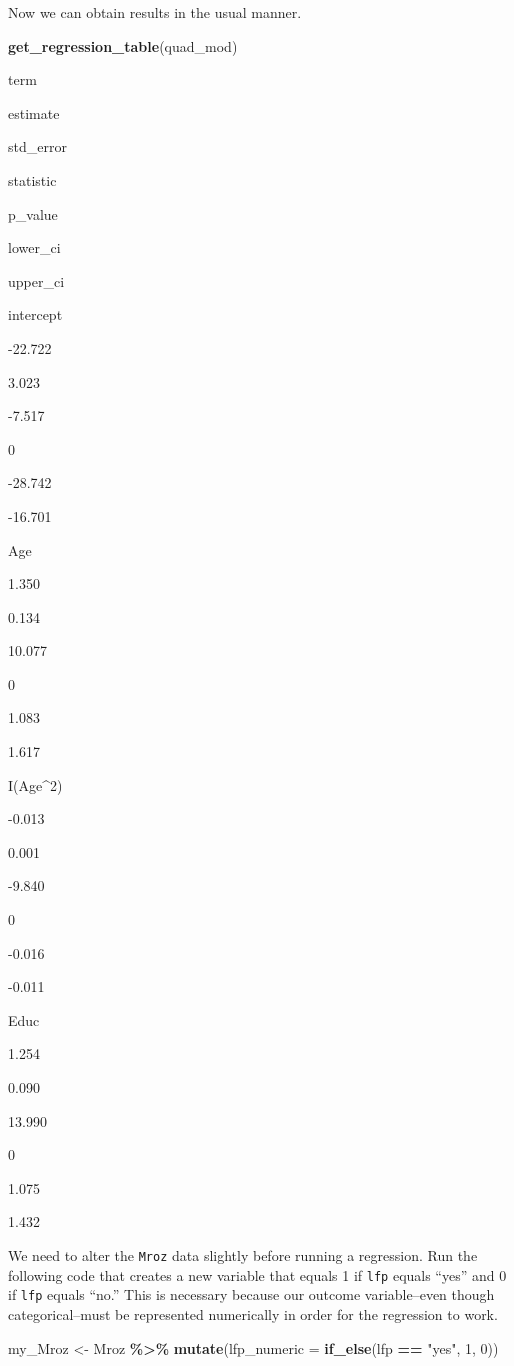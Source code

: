 \documentclass[
]{book}
\makeatletter
\newenvironment{Shaded}{\begin{snugshade}}{\end{snugshade}}
\newcommand{\AttributeTok}[1]{\textcolor[rgb]{0.27,0.27,0.27}{#1}}
\newcommand{\DecValTok}[1]{\textcolor[rgb]{0.06,0.06,0.06}{#1}}
\newcommand{\FunctionTok}[1]{\textcolor[rgb]{0.27,0.27,0.27}{\textbf{#1}}}
\newcommand{\NormalTok}[1]{#1}
\newcommand{\OtherTok}[1]{\textcolor[rgb]{0.37,0.37,0.37}{#1}}
\newcommand{\SpecialCharTok}[1]{\textcolor[rgb]{0.43,0.43,0.43}{\textbf{#1}}}
\newcommand{\StringTok}[1]{\textcolor[rgb]{0.5,0.5,0.5}{#1}}
\newenvironment{kframe}{%
\medskip{}
\setlength{\fboxsep}{.8em}
 \def\at@end@of@kframe{}%
 \ifinner\ifhmode%
  \def\at@end@of@kframe{\end{minipage}}%
  \begin{minipage}{\columnwidth}%
 \fi\fi%
 \def\FrameCommand##1{\hskip\@totalleftmargin \hskip-\fboxsep
 \colorbox{shadecolor}{##1}\hskip-\fboxsep
     \hskip-\linewidth \hskip-\@totalleftmargin \hskip\columnwidth}%
 \MakeFramed {\advance\hsize-\width
   \@totalleftmargin\z@ \linewidth\hsize
   \@setminipage}}%
 {\par\unskip\endMakeFramed%
 \at@end@of@kframe}
\renewenvironment{Shaded}{\begin{kframe}}{\end{kframe}}
\makeatother
\begin{document}
Now we can obtain results in the usual manner.

\begin{Shaded}
\begin{Highlighting}[]
\FunctionTok{get\_regression\_table}\NormalTok{(quad\_mod)}
\end{Highlighting}
\end{Shaded}

term

estimate

std\_error

statistic

p\_value

lower\_ci

upper\_ci

intercept

-22.722

3.023

-7.517

0

-28.742

-16.701

Age

1.350

0.134

10.077

0

1.083

1.617

I(Age\^{}2)

-0.013

0.001

-9.840

0

-0.016

-0.011

Educ

1.254

0.090

13.990

0

1.075

1.432

We need to alter the \texttt{Mroz} data slightly before running a regression. Run the following code that creates a new variable that equals 1 if \texttt{lfp} equals ``yes'' and 0 if \texttt{lfp} equals ``no.'' This is necessary because our outcome variable--even though categorical--must be represented numerically in order for the regression to work.

\begin{Shaded}
\begin{Highlighting}[]
\NormalTok{my\_Mroz }\OtherTok{\textless{}{-}}\NormalTok{ Mroz }\SpecialCharTok{\%\textgreater{}\%} 
  \FunctionTok{mutate}\NormalTok{(}\AttributeTok{lfp\_numeric =} \FunctionTok{if\_else}\NormalTok{(lfp }\SpecialCharTok{==} \StringTok{"yes"}\NormalTok{, }\DecValTok{1}\NormalTok{, }\DecValTok{0}\NormalTok{))}
\end{Highlighting}
\end{Shaded}
\end{document}
